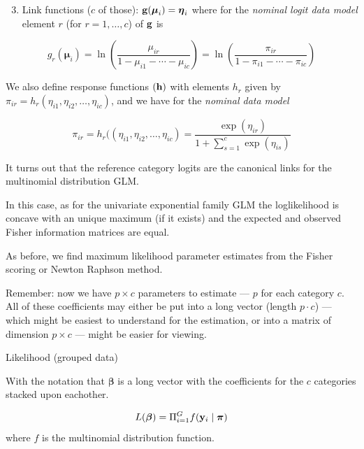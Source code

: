 \documentclass[
  ignorenonframetext,
]{beamer}
\providecommand{\tightlist}{%
  \setlength{\itemsep}{0pt}\setlength{\parskip}{0pt}}
\begin{document}
\begin{frame}
\begin{enumerate}
\setcounter{enumi}{2}
\tightlist
\item
  Link functions (\(c\) of those):
  \({\bf g}(\boldsymbol{\mu}_i)={\boldsymbol \eta}_i\) where for the
  \emph{nominal logit data model} element \(r\) (for \(r=1,\ldots, c\))
  of \({\bf g}\) is
\end{enumerate}

\[ g_{r}(\boldsymbol{\mu}_i)=\ln(\frac{\mu_{ir}}{1-\mu_{i1}-\cdots-\mu_{ic}})=
\ln(\frac{\pi_{ir}}{1-\pi_{i1}-\cdots-\pi_{ic}})\]

We also define response functions \((\bf h)\) with elements \(h_r\)
given by \(\pi_{ir}=h_r(\eta_{i1},\eta_{i2},\ldots,\eta_{ic})\), and we
have for the \emph{nominal data model}

\[\pi_{ir}=h_r((\eta_{i1},\eta_{i2},\ldots,\eta_{ic})=\frac{\exp(\eta_{ir})}{1+\sum_{s=1}^c \exp(\eta_{is})}\]
\end{frame}

\begin{frame}
It turns out that the reference category logits are the canonical links
for the multinomial distribution GLM.

In this case, as for the univariate exponential family GLM the
loglikelihood is concave with an unique maximum (if it exists) and the
expected and observed Fisher information matrices are equal.

As before, we find maximum likelihood parameter estimates from the
Fisher scoring or Newton Raphson method.

Remember: now we have \(p\times c\) parameters to estimate --- \(p\) for
each category \(c\). All of these coefficients may either be put into a
long vector (length \(p\cdot c\)) --- which might be easiest to
understand for the estimation, or into a matrix of dimension
\(p \times c\) --- might be easier for viewing.
\end{frame}

\begin{frame}
\begin{block}{Likelihood}
\label{likelihood}
(grouped data)

With the notation that \({\boldsymbol \beta}\) is a long vector with the
coefficients for the \(c\) categories stacked upon eachother.

\[L({\boldsymbol \beta})=\Pi_{i=1}^G f({\bf y}_i\mid {\boldsymbol \pi})\]
where \(f\) is the multinomial distribution function.
\end{block}
\end{frame}
\end{document}
